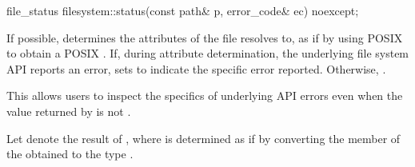 %
\begin{itemdecl}
file_status filesystem::status(const path& p, error_code& ec) noexcept;
\end{itemdecl}

\begin{itemdescr}
\pnum
\effects
If possible, determines the attributes
    of the file  resolves to, as if by using POSIX 
    to obtain a POSIX .
      If, during attribute determination, the underlying file system API reports
    an error, sets  to indicate the specific error reported.
    Otherwise, .
\begin{note}
This allows users to inspect the specifics of underlying
      API errors even when the value returned by  is not
      .
\end{note}

\pnum
Let  denote the result of ,
where  is determined as if by converting the  member
of the obtained  to the type .


\end{itemdescr}
